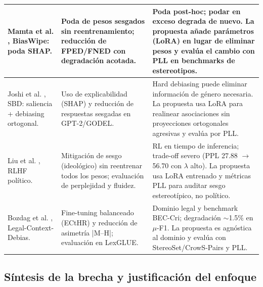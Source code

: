 \documentclass[12pt,a4paper]{report}
\begin{document}
\begin{longtable}{|P{4cm}|P{5.2cm}|P{5.2cm}|}
Mamta et al. \cite{mamta_biaswipe_2024}, BiasWipe: poda SHAP. &
Poda de pesos sesgados sin reentrenamiento; reducción de FPED/FNED con degradación acotada. &
Poda post-hoc; podar en exceso degrada de nuevo. La propuesta añade parámetros (LoRA) en lugar de eliminar pesos y evalúa el cambio con PLL en benchmarks de estereotipos. \\
\hline

Joshi et al. \cite{joshi_saliency_2024}, SBD: saliencia + debiasing ortogonal. &
Uso de explicabilidad (SHAP) y reducción de respuestas sesgadas en GPT-2/GODEL. &
Hard debiasing puede eliminar información de género necesaria. La propuesta usa LoRA para realinear asociaciones sin proyecciones ortogonales agresivas y evalúa por PLL. \\
\hline

Liu et al. \cite{liu_quantifying_2022}, RLHF político. &
Mitigación de sesgo (ideológico) sin reentrenar todos los pesos; evaluación de perplejidad y fluidez. &
RL en tiempo de inferencia; trade-off severo (PPL 27.88 $\rightarrow$ 56.70 con $\lambda$ alto). La propuesta usa LoRA entrenado y métricas PLL para auditar sesgo estereotípico, no político. \\
\hline

Bozdag et al. \cite{bozdag_measuring_2024}, Legal-Context-Debias. &
Fine-tuning balanceado (ECtHR) y reducción de asimetría |M--H|; evaluación en LexGLUE. &
Dominio legal y benchmark BEC-Cri; degradación $\sim$1.5\% en $\mu$-F1. La propuesta es agnóstica al dominio y evalúa con StereoSet/CrowS-Pairs y PLL. \\
\hline
\end{longtable}
\endgroup

\subsection{Síntesis de la brecha y justificación del enfoque}
\label{subsec:estado_arte_brecha}
\end{document}
